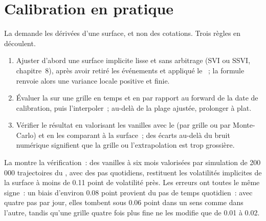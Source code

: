 \section{Calibration en pratique}

La  demande les dérivées d'une surface, et non des cotations. Trois règles en découlent.

\begin{method}\label{met:dv:local-volatility:build}
\begin{enumerate}
\item Ajuster d'abord une surface implicite lisse et sans arbitrage (SVI ou SSVI, chapitre~8), après avoir retiré les événements
et appliqué le ~; la formule renvoie alors une variance locale positive et finie.
\item Évaluer la  sur une grille en temps et en  par rapport au forward de la
date de calibration, puis l'interpoler~; au-delà de la plage ajustée, prolonger à plat.
\item Vérifier le résultat en valorisant les vanilles avec le  (par grille ou par Monte-Carlo)
et en les comparant à la surface~; des écarts au-delà du bruit numérique signifient que la grille ou l'extrapolation
est trop grossière.
\end{enumerate}
\end{method}

La  montre la vérification~: des vanilles à six mois valorisées par simulation de 200\,000
trajectoires du , avec des pas quotidiens, restituent les volatilités implicites de la surface à
moins de 0.11 point de volatilité près. Les erreurs ont toutes le même signe~: un biais d'environ 0.08 point provient du
pas de temps quotidien~: avec quatre pas par jour, elles tombent sous 0.06 point dans un sens comme dans l'autre, tandis
qu'une grille quatre fois plus fine ne les modifie que de 0.01 à 0.02.

